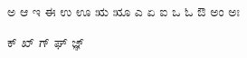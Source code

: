 \documentclass{article}
\begin{document}
ಅ ಆ ಇ ಈ ಉ ಊ ಋ ೠ ಎ ಏ ಐ ಒ ಓ ಔ ಅಂ ಅಃ

ಕ್ ಖ್ ಗ್ ಘ್ ಜ್ಞ್




\end{document}
